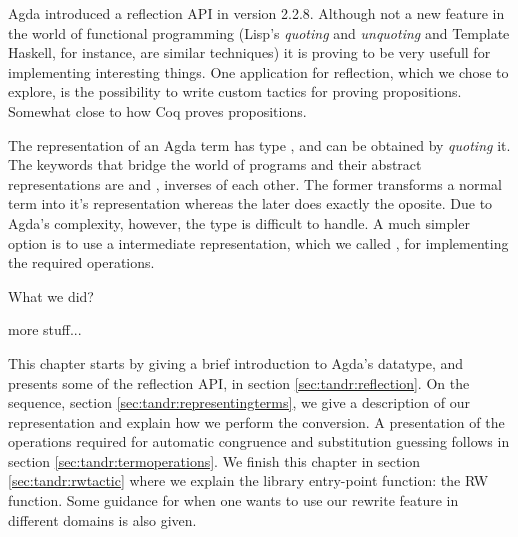 
Agda introduced a reflection API in version 2.2.8. Although not a new feature
in the world of functional programming (Lisp's \emph{quoting} and \emph{unquoting} 
and Template Haskell, for instance, are similar techniques) 
it is proving to be very usefull for implementing interesting things. 
One application for reflection, which we chose to explore, is 
the possibility to write custom tactics for proving propositions. 
Somewhat close to how Coq proves propositions.

The representation of an Agda term has type , and can be obtained
by \emph{quoting} it.
The keywords that bridge the world of programs and their abstract representations 
are  and , inverses of each other. 
The former transforms a normal term into it's  representation whereas the 
later does exactly the oposite. Due to Agda's complexity, however, the type  is difficult
to handle. A much simpler option is to use a intermediate representation, which we called ,
for implementing the required operations.

\begin{TODO}
  \item What we did?
  \item more stuff...
\end{TODO}

This chapter starts by giving a brief introduction to Agda's  datatype, and presents some
of the reflection API, in section \ref{sec:tandr:reflection}. 
On the sequence, section \ref{sec:tandr:representingterms}, we give a description of our  representation
and explain how we perform the conversion. A presentation of the operations required for 
automatic congruence and substitution guessing follows in section \ref{sec:tandr:termoperations}.
We finish this chapter in section \ref{sec:tandr:rwtactic} where we explain the library entry-point function: the RW function.
Some guidance for when one wants to use our rewrite feature in different domains is also given.
